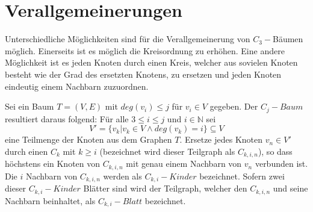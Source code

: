 \section{Verallgemeinerungen}
Unterschiedliche Möglichkeiten sind für die Verallgemeinerung von $C_3-$Bäumen möglich. Einerseits ist es möglich die Kreisordnung zu erhöhen. Eine andere Möglichkeit ist es jeden Knoten durch einen Kreis, welcher aus sovielen Knoten besteht wie der Grad des ersetzten Knotens, zu ersetzen und jeden Knoten eindeutig einem Nachbarn zuzuordnen.

\begin{defi}
Sei ein Baum $T=(V,E)$ mit $deg(v_i)\leq j$ für $v_i \in V$ gegeben. Der $C_j-Baum$ resultiert daraus folgend: 
Für alle $3 \leq i \leq j$ und $i \in \mathbb{N}$ sei $$V'=\{v_k|v_k \in V \wedge deg(v_k)=i\}\subseteq V$$ eine Teilmenge der Knoten aus dem Graphen $T$. Ersetze jedes Knoten $v_n \in V'$ durch einen $C_k$ mit $k \geq i$ (bezeichnet wird dieser Teilgraph als \emph{$C_{k,i,n}$}), so dass höchstens ein Knoten von $C_{k,i,n}$ mit genau einem Nachbarn von $v_n$ verbunden ist. Die $i$ Nachbarn von $C_{k,i,n}$ werden als \emph{$C_{k,i}-Kinder$} bezeichnet. Sofern zwei dieser $C_{k,i}-Kinder$ Blätter sind wird der Teilgraph, welcher den $C_{k,i,n}$ und seine Nachbarn beinhaltet, als \emph{$C_{k,i}-Blatt$} bezeichnet.
\end{defi}

\begin{bsp}~\newline

\end{bsp}

